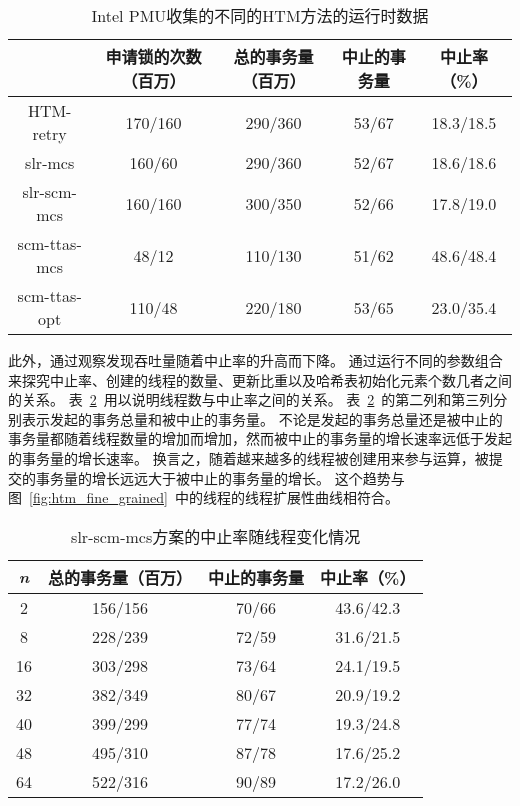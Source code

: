 \begin{table}[htbp]
  \centering
  \caption{Intel PMU收集的不同的HTM方法的运行时数据}
  \label{tab:htm_abort_rate}
  \begin{tabular}{ccccc}
    \toprule
                  & 申请锁的次数（百万） & 总的事务量（百万） & 中止的事务量 & 中止率（\%） \\
    \midrule
      HTM-retry   & 170/160           & 290/360         & 53/67      & 18.3/18.5 \\
      slr-mcs     & 160/60            & 290/360         & 52/67      & 18.6/18.6 \\
      slr-scm-mcs & 160/160           & 300/350         & 52/66      & 17.8/19.0 \\
      scm-ttas-mcs& 48/12             & 110/130         & 51/62      & 48.6/48.4 \\
      scm-ttas-opt& 110/48            & 220/180         & 53/65      & 23.0/35.4 \\
    \bottomrule
  \end{tabular}
\end{table}

此外，通过观察发现吞吐量随着中止率的升高而下降。
通过运行不同的参数组合来探究中止率、创建的线程的数量、更新比重以及哈希表初始化元素个数几者之间的关系。
表~\ref{tab:abort_rate_thread}~用以说明线程数与中止率之间的关系。
表~\ref{tab:abort_rate_thread}~的第二列和第三列分别表示发起的事务总量和被中止的事务量。
不论是发起的事务总量还是被中止的事务量都随着线程数量的增加而增加，然而被中止的事务量的增长速率远低于发起的事务量的增长速率。
换言之，随着越来越多的线程被创建用来参与运算，被提交的事务量的增长远远大于被中止的事务量的增长。
这个趋势与图~\ref{fig:htm_fine_grained}~中的线程的线程扩展性曲线相符合。

\begin{table}[htbp]
  \centering
  \caption{slr-scm-mcs方案的中止率随线程变化情况}
  \label{tab:abort_rate_thread}
  \begin{tabular}{cccc}
    \toprule
      \textit{n}  & 总的事务量（百万） & 中止的事务量 & 中止率（\%） \\
    \midrule
      2   & 156/156 & 70/66 & 43.6/42.3  \\
      8   & 228/239 & 72/59 & 31.6/21.5 \\
      16  & 303/298 & 73/64 & 24.1/19.5  \\
      32  & 382/349 & 80/67 & 20.9/19.2  \\
      40  & 399/299 & 77/74 & 19.3/24.8 \\
      48  & 495/310 & 87/78 & 17.6/25.2  \\
      64  & 522/316 & 90/89 & 17.2/26.0 \\
    \bottomrule
  \end{tabular}
\end{table}

